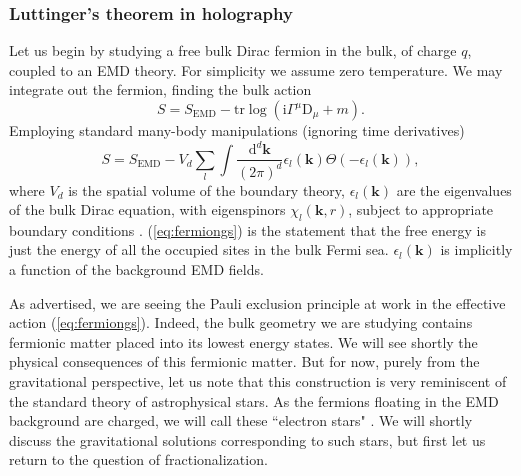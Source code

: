 \documentclass[10pt, oneside]{book}
\begin{document}
\begin{doublespace}
\subsubsection{Luttinger's theorem in holography}
Let us begin by studying a free bulk Dirac fermion in the bulk, of charge $q$,  coupled to an EMD theory.    For simplicity we assume zero temperature. We may integrate out the fermion, finding the bulk action \begin{equation}
S = S_{\mathrm{EMD}} - \mathrm{tr} \log \left(\mathrm{i}\Gamma^\mu \mathrm{D}_\mu + m\right).
\end{equation} 
Employing standard many-body manipulations (ignoring time derivatives) \begin{equation}
S = S_{\mathrm{EMD}} - V_d\sum_l \int \frac{\mathrm{d}^d\mathbf{k}}{(2\pi)^d} \epsilon_l(\mathbf{k}) \Theta(-\epsilon_l(\mathbf{k})),  \label{eq:fermiongs}
\end{equation}
where $V_d$ is the spatial volume of the boundary theory, $\epsilon_l(\mathbf{k})$ are the eigenvalues of the bulk Dirac equation, with eigenspinors $\chi_l(\mathbf{k},r)$, subject to appropriate boundary conditions \cite{Sachdev:2011ze, Iqbal:2011bf}.   (\ref{eq:fermiongs}) is the statement that the free energy is just the energy of all the occupied sites in the bulk Fermi sea.   $\epsilon_l(\mathbf{k})$ is implicitly a function of the background EMD fields.

As advertised, we are seeing the Pauli exclusion principle at work in the effective action (\ref{eq:fermiongs}).   Indeed, the bulk geometry we are studying contains fermionic matter placed into its lowest energy states.   We will see shortly the physical consequences of this fermionic matter.   But for now,  purely from the gravitational perspective, let us note that this construction is very reminiscent of the standard theory of astrophysical stars.    As the fermions floating in the EMD background are charged, we will call these ``electron stars" \cite{Hartnoll:2010gu}.   We will shortly discuss the gravitational solutions corresponding to such stars, but first let us return to the question of fractionalization.


\end{doublespace}
\end{document}
